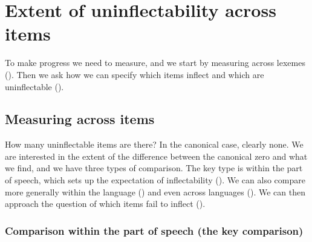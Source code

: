 \documentclass[output=paper]{langscibook}
\begin{document}
\section{\textbf{Extent} \textbf{of} \textbf{uninflectability} \textbf{across} \textbf{items}}

To make progress we need to measure, and we start by measuring across lexemes (). Then we ask how we can specify which items inflect and which are uninflectable ().

\subsection{\textbf{Measuring} \textbf{across} \textbf{items}}

How many uninflectable items are there? In the canonical case, clearly none. We are interested in the extent of the difference between the canonical zero and what we find, and we have three types of comparison. The key type is within the part of speech, which sets up the expectation of inflectability (). We can also compare more generally within the language () and even across languages (). We can then approach the question of which items fail to inflect (). 

\subsubsection{\textbf{Comparison} \textbf{within} \textbf{the} \textbf{part} \textbf{of} \textbf{speech} \textbf{(the} \textbf{key} \textbf{comparison)}}
\end{document}
